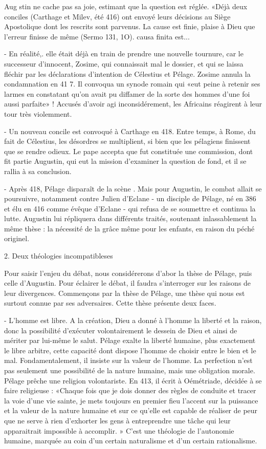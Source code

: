 Aug stin ne cache pas sa joie, estimant que la question est réglée. «Déjà deux conciles (Carthage et Milev, été 416) ont envoyé leurs décisions au Siège Apostolique dont les rescrits sont parvenus. La cause est finie, plaise à Dieu que l'erreur finisse de même (Sermo 131, 1O). causa finita est...

-	En réalité,. elle était déjà en train de prendre une nouvelle tournure, car le successeur d'innocent, Zosime, qui connaissait mal le dossier, et qui se laissa fléchir par les déclarations d'intention de Célestius et Pélage. Zosime annula la condamnation en 41 7. Il convoqua un synode romain qui «eut peine à retenir ses larmes en constatant qu'on avait pu diffamer de la sorte des hommes d'une foi aussi parfaite» ! Accusés d'avoir agi inconsidérement, les Africains réagirent à leur tour très violemment.

-	Un nouveau concile est convoqué à Carthage en 418. Entre temps, à Rome, du fait de Célestius, les désordres se multiplient, si bien que les pélagiens finissent que se rendre odieux. Le pape accepta que fut constituée une commission, dont fit partie Augustin, qui eut la mission d'examiner la question de fond, et il se rallia à sa conclusion.

-	Après 418, Pélage disparaît de la scène . Mais pour Augustin, le combat allait se poursuivre, notamment contre Julien  d'Eclane - un disciple de Pélage, né en 386 et élu en 416 comme évêque d'Eclane - qui refusa de se soumettre et continua la lutte. Augustin lui répliquera dans différents traités, soutenant inlassablement la même thèse : la nécessité de la grâce même pour les enfants, en raison du péché originel.

2.	Deux  théologies  incompatibleses

Pour saisir l'enjeu du débat, nous considérerons d'abor la thèse de Pélage, puis celle d'Augustin. Pour éclairer le débat, il faudra s'interroger sur les raisons de leur divergences. Commençons par la thèse de Pélage, une thèse qui nous est surtout connue par ses adversaires. Cette thèse présente deux faces.

-	L'homme est libre. A la création, Dieu a donné à l'homme la liberté et la raison, donc la possibilité d'exécuter volontairement le dessein de Dieu et ainsi de mériter par lui-même le salut. Pélage exalte la liberté humaine, plus exactement le libre arbitre, cette capacité dont dispose l'homme de choisir entre le bien et le mal. Fondamentalement, il insiste sur la valeur de l'homme. La perfection n'est pas seulement une possibilité de la nature humaine, mais une obligation morale. Pélage prêche une religion volontariste. En 413, il écrit à Oémétriade, décidée à se faire religieuse : «Chaque fois que je dois donner des règles de conduite et tracer la voie d'une vie sainte, je mets toujours en premier fieu l'accent sur la puissance et la valeur de la nature humaine et sur ce qu'elle est capable de réaliser de peur que ne serve à rien d'exhorter les gens à entreprendre une tâche qui leur apparaitrait impossible à accomplir. » C'est une théologie de l'autonomie humaine, marquée au coin d'un certain naturalisme et d'un certain rationalisme.



